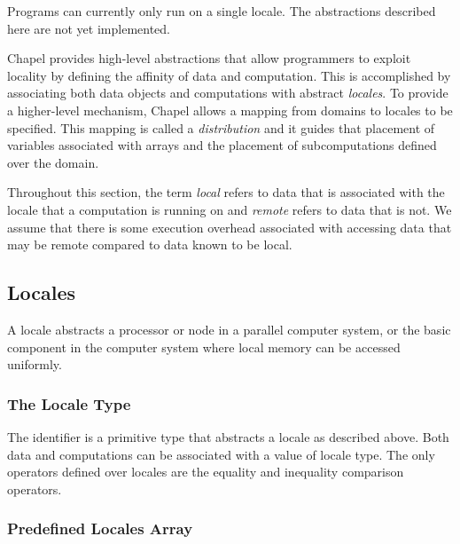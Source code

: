 \label{Locality_and_Distribution}

\begin{status}
Programs can currently only run on a single locale.  The abstractions
described here are not yet implemented.
\end{status}

Chapel provides high-level abstractions that allow programmers to
exploit locality by defining the affinity of data and computation.
This is accomplished by associating both data objects and computations
with abstract {\em locales}. To provide a higher-level mechanism,
Chapel allows a mapping from domains to locales to be specified. This
mapping is called a {\em distribution} and it guides that placement of
variables associated with arrays and the placement of subcomputations
defined over the domain.

Throughout this section, the term {\em local} refers to data that is
associated with the locale that a computation is running on and {\em
remote} refers to data that is not. We assume that there is some
execution overhead associated with accessing data that may be remote
compared to data known to be local.

\subsection{Locales}
\label{Locales}

A locale abstracts a processor or node in a parallel computer system,
or the basic component in the computer system where local memory can
be accessed uniformly.

\subsubsection{The Locale Type}
\label{The_Locale_Type}

The identifier  is a primitive type that abstracts a
locale as described above.  Both data and computations can be
associated with a value of locale type. The only operators defined
over locales are the equality and inequality comparison operators.

\subsubsection{Predefined Locales Array}
\label{Predefined_Locales_Array}

